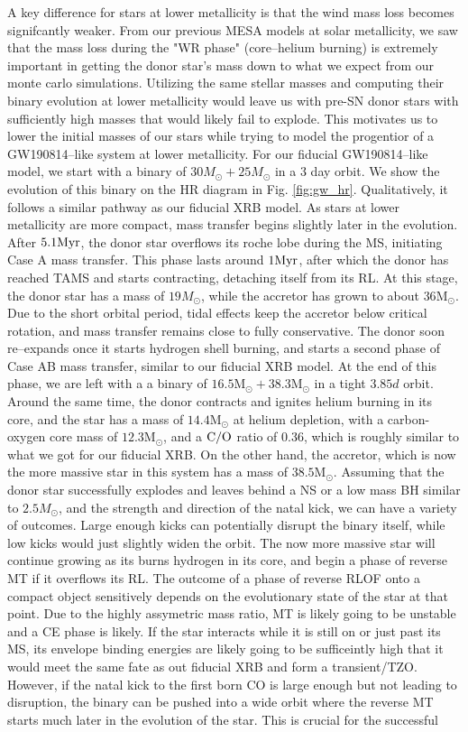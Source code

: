 \documentclass[linenumbers,trackchanges,twocolumn]{aastex701}
\newcommand{\Mdot}{\mathrm{M}_{\odot}}
\begin{document}
A key difference for stars at lower metallicity is that the wind mass loss becomes signifcantly weaker. From our previous MESA models at solar metallicity, we saw that the mass loss during the "WR phase" (core--helium burning) is extremely important in getting the donor star's mass down to what we expect from our monte carlo simulations. Utilizing the same stellar masses and computing their binary evolution at lower metallicity would leave us with pre-SN donor stars with sufficiently high masses that would likely fail to explode. This motivates us to lower the initial masses of our stars while trying to model the progentior of a GW190814--like system at lower metallicity. For our fiducial GW190814--like model, we start with a binary of $30M_{\odot}+25M_{\odot}$ in a 3 day orbit. We show the evolution of this binary on the HR diagram in Fig. \ref{fig:gw_hr}. Qualitatively, it follows a similar pathway as our fiducial XRB model. As stars at lower metallicity are more compact, mass transfer begins slightly later in the evolution. After $5.1 \rm Myr$, the donor star overflows its roche lobe during the MS, initiating Case A mass transfer. This phase lasts around $1 \rm Myr$, after which the donor has reached TAMS and starts contracting, detaching itself from its RL. At this stage, the donor star has a mass of $19M_{\odot}$, while the accretor has grown to about $36\Mdot$. Due to the short orbital period, tidal effects keep the accretor below critical rotation, and mass transfer remains close to fully conservative. The donor soon re--expands once it starts hydrogen shell burning, and starts a second phase of Case AB mass transfer, similar to our fiducial XRB model. At the end of this phase, we are left with a a binary of $16.5\Mdot+38.3\Mdot$ in a tight $3.85d$ orbit. Around the same time, the donor contracts and ignites helium burning in its core, and the star has a mass of $14.4\Mdot$ at helium depletion, with a carbon-oxygen core mass of $12.3\Mdot$, and a $\rm C/O$ ratio of $0.36$, which is roughly similar to what we got for our fiducial XRB. On the other hand, the accretor, which is now the more massive star in this system has a mass of $38.5\Mdot$. Assuming that the donor star successfully explodes and leaves behind a NS or a low mass BH similar to $2.5M_{\odot}$, and the strength and direction of the natal kick, we can have a variety of outcomes. Large enough kicks can potentially disrupt the binary itself, while low kicks would just slightly widen the orbit. The now more massive star will continue growing as its burns hydrogen in its core, and begin a phase of reverse MT if it overflows its RL. The outcome of a phase of reverse RLOF onto a compact object sensitively depends on the evolutionary state of the star at that point. Due to the highly assymetric mass ratio, MT is likely going to be unstable and a CE phase is likely. If the star interacts while it is still on or just past its MS, its envelope binding energies are likely going to be sufficeintly high that it would meet the same fate as out fiducial XRB and form a transient/TZO. However, if the natal kick to the first born CO is large enough but not leading to disruption, the binary can be pushed into a wide orbit where the reverse MT starts much later in the evolution of the star. This is crucial for the successful 
\end{document}

